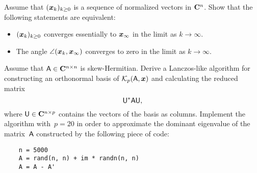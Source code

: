 \begin{exercise}
    Assume that $(\mathbf{\boldsymbol{x}}_k)_{k \geq 0}$ is a sequence of normalized vectors in $\mathbf C^n$.
    Show that the following statements are equivalent:
    \begin{itemize}
        \item $(\mathbf{\boldsymbol{x}}_k)_{k \geq 0}$ converges essentially to $\mathbf{\boldsymbol{x}}_{\infty}$ in the limit as $k \to \infty$.
        \item The angle $\angle(\mathbf{\boldsymbol{x}}_k, \mathbf{\boldsymbol{x}}_{\infty})$ converges to zero in the limit as $k \to \infty$.
    \end{itemize}
\end{exercise}

\begin{exercise}
    Assume that $\mathsf A \in \mathbf C^{n \times n}$ is skew-Hermitian.
    Derive a Lanczos-like algorithm for constructing an orthonormal basis of $\mathcal K_p(\mathsf A, \mathbf{\boldsymbol{x}})$ 
    and calculating the reduced matrix
    \[
        \mathsf U^* \mathsf A \mathsf U,
    \]
    where $\mathsf U \in \mathbf C^{n \times p}$ contains the vectors of the basis as columns.
    Implement the algorithm with~$p = 20$ in order to approximate the dominant eigenvalue of the matrix~$\mathsf A$ constructed by the following piece of code:
    \begin{verbatim}
    n = 5000
    A = rand(n, n) + im * randn(n, n)
    A = A - A'
    \end{verbatim}
\end{exercise}
